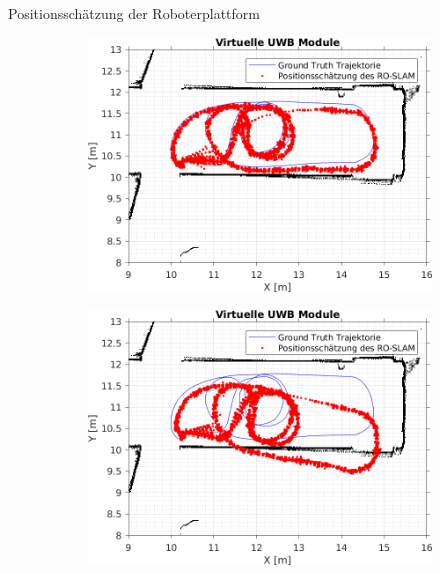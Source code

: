 \documentclass{beamer}
\begin{document}
\begin{frame}{Positionsschätzung der Roboterplattform}
\begin{figure}
\begin{subfigure}{0.41\linewidth}
		\end{subfigure}
		\par
		\bigskip
		\begin{subfigure}{0.41\linewidth}
			\centering
			\includegraphics[width=\linewidth]{Record_2018-02-08-12-33-53_filtered_5_trajectory_pf}
		\end{subfigure}
		\hfill
		\begin{subfigure}{0.41\linewidth}
			\centering
			\includegraphics[width=\linewidth]{Record_2018-02-08-12-33-53_filtered_4_trajectory_pf}
		\end{subfigure}
	\end{figure}
	
\end{frame}
\end{document}
